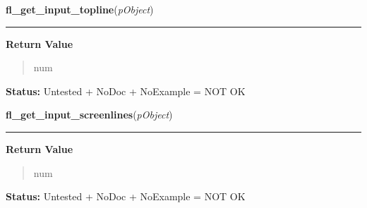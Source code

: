     \label{xformslib:library:fl_get_input_topline}

    \vspace{0.5ex}

\hspace{.8\funcindent}\begin{boxedminipage}{\funcwidth}

    \raggedright \textbf{fl\_get\_input\_topline}(\textit{pObject})

    \vspace{-1.5ex}

    \rule{\textwidth}{0.5\fboxrule}
\setlength{\parskip}{2ex}
\setlength{\parskip}{1ex}
      \textbf{Return Value}
    \vspace{-1ex}

      \begin{quote}
      num

      \end{quote}

\textbf{Status:} Untested + NoDoc + NoExample = NOT OK



    \end{boxedminipage}

    \label{xformslib:library:fl_get_input_screenlines}

    \vspace{0.5ex}

\hspace{.8\funcindent}\begin{boxedminipage}{\funcwidth}

    \raggedright \textbf{fl\_get\_input\_screenlines}(\textit{pObject})

    \vspace{-1.5ex}

    \rule{\textwidth}{0.5\fboxrule}
\setlength{\parskip}{2ex}
\setlength{\parskip}{1ex}
      \textbf{Return Value}
    \vspace{-1ex}

      \begin{quote}
      num

      \end{quote}

\textbf{Status:} Untested + NoDoc + NoExample = NOT OK



    \end{boxedminipage}

